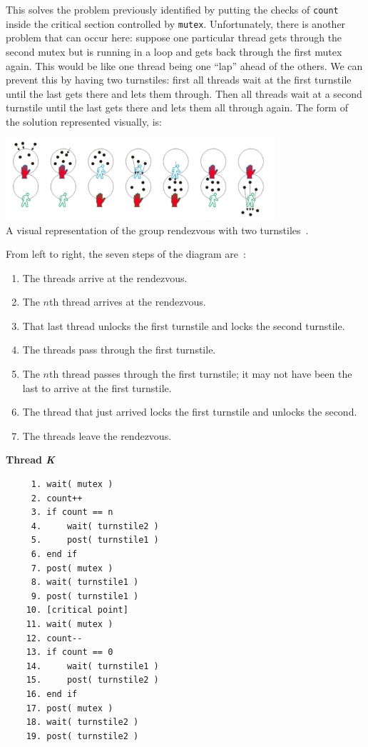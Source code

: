 \documentclass[a4paper]{report}
\begin{document}
This solves the problem previously identified by putting the checks of \texttt{count} inside the critical section controlled by \texttt{mutex}. Unfortunately, there is another problem that can occur here: suppose one particular thread gets through the second mutex but is running in a loop and gets back through the first mutex again. This would be like one thread being one ``lap'' ahead of the others. We can prevent this by having two turnstiles: first all threads wait at the first turnstile until the last gets there and lets them through. Then all threads wait at a second turnstile until the last gets there and lets them all through again. The form of the solution represented visually, is:

\begin{center}
	\includegraphics[width=0.75\textwidth]{images/reusable-barrier.png}\\
	A visual representation of the group rendezvous with two turnstiles~\cite{mte241}.
\end{center}

From left to right, the seven steps of the diagram are~\cite{mte241}:
\begin{enumerate}
	\item The threads arrive at the rendezvous.
	\item The $n$th thread arrives at the rendezvous.
	\item That last thread unlocks the first turnstile and locks the second turnstile.
	\item The threads pass through the first turnstile.
	\item The $n$th thread passes through the first turnstile; it may not have been the last to arrive at the first turnstile.
	\item The thread that just arrived locks the first turnstile and unlocks the second.
	\item The threads leave the rendezvous.
\end{enumerate}

\textbf{Thread \textit{K}}\vspace{-2em}
\begin{verbatim}
	 1. wait( mutex )
	 2. count++
	 3. if count == n
	 4.     wait( turnstile2 )
	 5.     post( turnstile1 )
	 6. end if
	 7. post( mutex )
	 8. wait( turnstile1 )
	 9. post( turnstile1 )
	10. [critical point]
	11. wait( mutex )
	12. count--
	13. if count == 0
	14.     wait( turnstile1 )
	15.     post( turnstile2 )
	16. end if
	17. post( mutex )
	18. wait( turnstile2 )
	19. post( turnstile2 )
  \end{verbatim}
\vspace{-2em}
\end{document}
